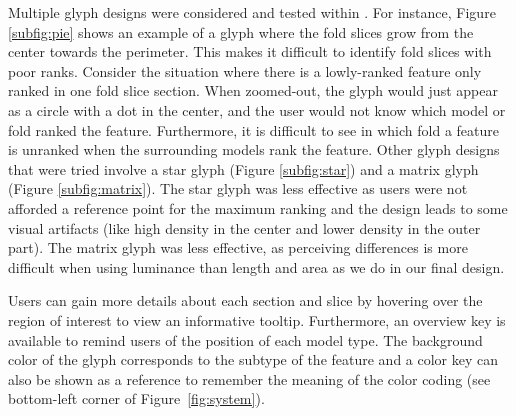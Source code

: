

Multiple glyph designs were considered and tested within \infuse.  For instance, Figure \ref{subfig:pie} shows an example of a glyph where the fold slices grow from the center towards the perimeter.
This makes it difficult to identify fold slices with poor ranks.
Consider the situation where there is a lowly-ranked feature only ranked in one fold slice section.  When zoomed-out, the glyph would just appear as a circle with a dot in the center, and the user would not know which model or fold ranked the feature.  Furthermore, it is difficult to see in which fold a feature is unranked when the surrounding models rank the feature.  Other glyph designs that were tried involve a star glyph (Figure \ref{subfig:star}) and a matrix glyph (Figure \ref{subfig:matrix}).  The star glyph was less effective as users were not afforded a reference point for the maximum ranking and the design leads to some visual artifacts (like high density in the center and lower density in the outer part).
The matrix glyph was less effective, as perceiving differences is more difficult when using luminance than length and area as we do in our final design.


Users can gain more details about each section and slice by hovering over the region of interest to view an informative tooltip. Furthermore, an overview key is available to remind users of the position of each model type. The background color of the glyph corresponds to the subtype of the feature and a color key can also be shown as a reference to remember the meaning of the color coding (see bottom-left corner of Figure~\ref{fig:system}).


